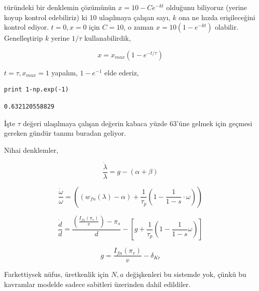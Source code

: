 \documentclass[12pt,fleqn]{article}\usepackage{../../common}
\begin{document}
türündeki bir denklemin çözümünün $x = 10 - C e^{-kt}$ olduğunu biliyoruz
(yerine koyup kontrol edebiliriz) ki 10 ulaşılmaya çalışan sayı, $k$ ona ne
hızda erişileceğini kontrol ediyor. $t=0,x=0$ için $C=10$, o zaman
$x = 10 (1 - e^{-kt})$ olabilir. Genelleştirip $k$ yerine $1/\tau$
kullanabilirdik,

$$ x = x_{max} (1-e^{-t/\tau}) $$ 

$t=\tau,x_{max}=1$ yapalım, $1-e^{-1}$ elde ederiz,

\begin{verbatim}
print 1-np.exp(-1)
\end{verbatim}

\begin{verbatim}
0.632120558829
\end{verbatim}

İşte $\tau$ değeri ulaşılmaya çalışan değerin kabaca yüzde 63'üne gelmek
için geçmesi gereken gündür tanımı buradan geliyor.

Nihai denklemler,

$$ 
\frac{\dot{\lambda}}{\lambda} =
  g - (\alpha + \beta)
$$

$$ 
\frac{\dot{\omega}}{\omega} = 
\left( 
(w_{fn}(\lambda) - \alpha) + \frac{1}{\tau_p} \left( 1-\frac{1}{1-s} \cdot \omega\right)
\right)
$$


$$ 
\frac{\dot{d}}{d} = 
\frac{\left( \frac{I_{fn}(\pi_r)}{v} \right) - \pi_s }{d} - 
\left[ 
g + \frac{1}{\tau_p} \left(1 - \frac{1}{1-s} \omega\right)
\right]
$$

$$ g = \frac{I_{fn}(\pi_r)}{v} - \delta_{Kr} $$

Farkettiysek nüfus, üretkenlik için $N,a$ değişkenleri bu sistemde yok,
çünkü bu kavramlar modelde sadece sabitleri üzerinden dahil edildiler.
\end{document}
